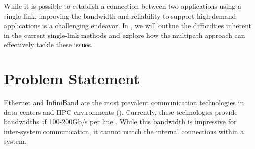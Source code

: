 While it is possible to establish a connection between two applications using a single link, improving the bandwidth and reliability to support high-demand applications is a challenging endeavor. 
In , we will outline the difficulties inherent in the current single-link methods and explore how the multipath approach can effectively tackle these issues.

\section{Problem Statement}\label{sec:introduction:problem_statement}
Ethernet and InfiniBand are the most prevalent communication technologies in data centers and \ac{HPC} environments (). 
Currently, these technologies provide bandwidths of 100-200Gb/s per line \cite{ethernet_roadmap}\cite{infiniband_roadmap}. 
While this bandwidth is impressive for inter-system communication, it cannot match the internal connections within a system. 
